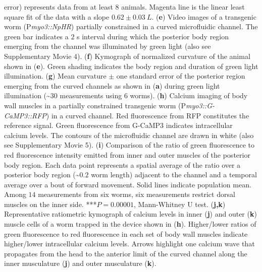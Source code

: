 \begin{FPfigure}
{error) represents data from at least 8 animals. Magenta line is the linear least square fit of the 
data with a slope $0.62 \pm 0.03~L$.  
(\textbf{e}) Video images of a transgenic worm (P\textit{myo3::NpHR}) partially constrained in a curved 
microfluidic channel. The green bar indicates a $2$ s interval during which the posterior body 
region emerging from the channel was illuminated by green light (also see Supplementary Movie 
4). 
(\textbf{f}) Kymograph of normalized curvature of the animal shown in (\textbf{e}). Green shading indicates the 
body region and duration of green light illumination.  
(\textbf{g}) Mean curvature $\pm$ one standard error of the posterior region emerging from the curved 
channels as shown in (\textbf{a}) during green light illumination (\textasciitilde$30$ measurements using 6 worms). 
(\textbf{h}) Calcium imaging of body wall muscles in a partially constrained transgenic worm 
(P\textit{myo3::G-CaMP3::RFP}) in a curved channel. Red fluorescence from RFP constitutes the 
reference signal. Green fluorescence from G-CaMP3 indicates intracellular calcium levels. The 
contours of the microfluidic channel are drawn in white (also see Supplementary Movie 5). 
(\textbf{i}) Comparison of the ratio of green fluorescence to red fluorescence intensity emitted from inner 
and outer muscles of the posterior body region. Each data point represents a spatial average of 
the ratio over a posterior body region (\textasciitilde$0.2$ worm length) adjacent to the channel and a temporal 
average over a bout of forward movement. Solid lines indicate population mean. Among $14$ 
measurements from six worms, six measurements restrict dorsal muscles on the inner side. ***$P= 0.00001$, Mann-Whitney U test. 
(\textbf{j,k}) Representative ratiometric kymograph of calcium levels in inner (\textbf{j}) and outer (\textbf{k}) muscle 
cells of a worm trapped in the device shown in (\textbf{h}). Higher/lower ratios of green fluorescence to 
red fluorescence in each set of body wall muscles indicate higher/lower intracellular calcium 
levels. Arrows highlight one calcium wave that propagates from the head to the anterior limit of 
the curved channel along the inner musculature (\textbf{j}) and outer musculature (\textbf{k}).\label{fig:proc2}}
\end{FPfigure}


